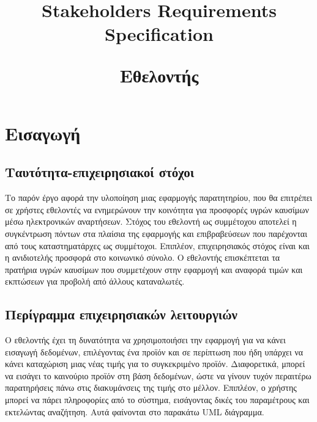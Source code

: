 \documentclass[a4paper,oneside, 12pt]{article}
\title{Stakeholders Requirements Specification\\
\begin{flushleft}
	Εθελοντής
\end{flushleft}}
\date{\vspace{-5ex}}
\begin{document}
\maketitle
\section{Εισαγωγή}
\subsection{Ταυτότητα-επιχειρησιακοί στόχοι}

Το παρόν έργο αφορά την υλοποίηση μιας εφαρμογής παρατητηρίου, που θα επιτρέπει 
σε χρήστες εθελοντές να ενημερώνουν την κοινότητα για προσφορές υγρών καυσίμων 
μέσω ηλεκτρονικών αναρτήσεων. Στόχος του εθελοντή ως συμμέτοχου αποτελεί η 
συγκέντρωση πόντων στα πλαίσια της εφαρμογής και επιβραβεύσεων που παρέχονται 
από τους καταστηματάρχες ως συμμέτοχοι. Επιπλέον, επιχειρησιακός στόχος είναι 
και η ανιδιοτελής προσφορά στο κοινωνικό σύνολο. Ο εθελοντής επισκέπτεται τα 
πρατήρια υγρών καυσίμων που συμμετέχουν στην εφαρμογή και αναφορά τιμών και 
εκπτώσεων για προβολή από άλλους καταναλωτές.

\subsection{Περίγραμμα επιχειρησιακών λειτουργιών}

Ο εθελοντής έχει τη δυνατότητα να χρησιμοποιήσει την εφαρμογή για να κάνει 
εισαγωγή δεδομένων, επιλέγοντας ένα προϊόν και σε περίπτωση που ήδη υπάρχει 
να κάνει καταχώριση μιας νέας τιμής για το συγκεκριμένο προϊόν. Διαφορετικά, 
μπορεί να εισάγει το καινούριο προϊόν στη βάση δεδομένων, ώστε να γίνουν 
τυχόν περαιτέρω παρατηρήσεις πάνω στις διακυμάνσεις της τιμής στο μέλλον. 
Επιπλέον, ο χρήστης μπορεί να πάρει πληροφορίες από το σύστημα, εισάγοντας 
δικές του παραμέτρους και εκτελώντας αναζήτηση. Αυτά φαίνονται στο παρακάτω 
UML διάγραμμα.
\end{document}
